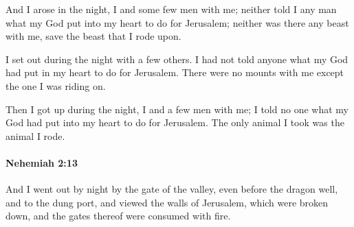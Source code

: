 			\begin{versebox}
					\item[BHS] 
					\item[LXX] 
					\item[ASV] And I arose in the night, I and some few men with me; neither told I any man what my God put into my heart to do for Jerusalem; neither was there any beast with me, save the beast that I rode upon.
					\item[NIV] I set out during the night with a few others. I had not told anyone what my God had put in my heart to do for Jerusalem. There were no mounts with me except the one I was riding on.
					\item[NRSV] Then I got up during the night, I and a few men with me; I told no one what my God had put into my heart to do for Jerusalem. The only animal I took was the animal I rode.
			\end{versebox}

		\paragraph{Nehemiah 2:13} %
			\label{NEHEMIAH-2-13}

			And I went out by night by the gate of the valley, even before the dragon well, and to the dung port, and viewed the walls of Jerusalem, which were broken down, and the gates thereof were consumed with fire.

